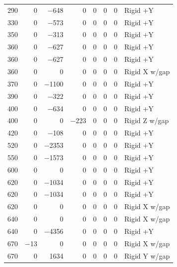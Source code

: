 \begin{longtable}{lrrrrrrl}
    290 & \num{0} & \num{-648} & \num{0} & \num{0} & \num{0} & \num{0} & Rigid +Y \\
    330 & \num{0} & \num{-573} & \num{0} & \num{0} & \num{0} & \num{0} & Rigid +Y \\
    350 & \num{0} & \num{-313} & \num{0} & \num{0} & \num{0} & \num{0} & Rigid +Y \\
    360 & \num{0} & \num{-627} & \num{0} & \num{0} & \num{0} & \num{0} & Rigid +Y \\
    360 & \num{0} & \num{-627} & \num{0} & \num{0} & \num{0} & \num{0} & Rigid +Y \\
    360 & \num{0} & \num{0} & \num{0} & \num{0} & \num{0} & \num{0} & Rigid X w/gap \\
    370 & \num{0} & \num{-1100} & \num{0} & \num{0} & \num{0} & \num{0} & Rigid +Y \\
    390 & \num{0} & \num{-322} & \num{0} & \num{0} & \num{0} & \num{0} & Rigid +Y \\
    400 & \num{0} & \num{-634} & \num{0} & \num{0} & \num{0} & \num{0} & Rigid +Y \\
    400 & \num{0} & \num{0} & \num{-223} & \num{0} & \num{0} & \num{0} & Rigid Z w/gap \\
    420 & \num{0} & \num{-108} & \num{0} & \num{0} & \num{0} & \num{0} & Rigid +Y \\
    520 & \num{0} & \num{-2353} & \num{0} & \num{0} & \num{0} & \num{0} & Rigid +Y \\
    550 & \num{0} & \num{-1573} & \num{0} & \num{0} & \num{0} & \num{0} & Rigid +Y \\
    600 & \num{0} & \num{0} & \num{0} & \num{0} & \num{0} & \num{0} & Rigid +Y \\
    620 & \num{0} & \num{-1034} & \num{0} & \num{0} & \num{0} & \num{0} & Rigid +Y \\
    620 & \num{0} & \num{-1034} & \num{0} & \num{0} & \num{0} & \num{0} & Rigid +Y \\
    620 & \num{0} & \num{0} & \num{0} & \num{0} & \num{0} & \num{0} & Rigid X w/gap \\
    640 & \num{0} & \num{0} & \num{0} & \num{0} & \num{0} & \num{0} & Rigid X w/gap \\
    640 & \num{0} & \num{-4356} & \num{0} & \num{0} & \num{0} & \num{0} & Rigid +Y \\
    670 & \num{-13} & \num{0} & \num{0} & \num{0} & \num{0} & \num{0} & Rigid X w/gap \\
    670 & \num{0} & \num{1634} & \num{0} & \num{0} & \num{0} & \num{0} & Rigid Y w/gap \\

\end{longtable}
